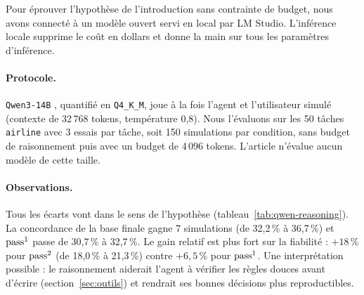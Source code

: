 Pour éprouver l'hypothèse de l'introduction sans contrainte de budget, nous avons connecté \taub{} à un modèle ouvert servi en local par LM Studio. L'inférence locale supprime le coût en dollars et donne la main sur tous les paramètres d'inférence.

\paragraph{Protocole.} \texttt{Qwen3-14B} \cite{qwen3}, quantifié en \texttt{Q4\_K\_M}, joue à la fois l'agent et l'utilisateur simulé (contexte de 32\,768 tokens, température 0,8). Nous l'évaluons sur les 50 tâches \texttt{airline} avec 3 essais par tâche, soit 150 simulations par condition, sans budget de raisonnement puis avec un budget de 4\,096 tokens. L'article n'évalue aucun modèle de cette taille.

\begin{table}[H]
  \centering\small
  \resizebox{\linewidth}{!}{}
  \caption{\texttt{Qwen3-14B} sur \texttt{airline} (50 tâches, 3 essais, $N=150$ par condition), sans et avec budget de raisonnement. Les lignes \texttt{READ} et \texttt{WRITE} comptent les actions de référence effectivement réalisées par l'agent.}
  \label{tab:qwen-reasoning}
\end{table}

\paragraph{Observations.} Tous les écarts vont dans le sens de l'hypothèse (tableau~\ref{tab:qwen-reasoning}). La concordance de la base finale gagne 7 simulations (de 32,2\,\% à 36,7\,\%) et $\text{pass}^{1}$ passe de 30,7\,\% à 32,7\,\%. Le gain relatif est plus fort sur la fiabilité : $+18$\,\% pour $\text{pass}^{2}$ (de 18,0\,\% à 21,3\,\%) contre $+6{,}5$\,\% pour $\text{pass}^{1}$. Une interprétation possible : le raisonnement aiderait l'agent à vérifier les règles douces avant d'écrire (section~\ref{sec:outils}) et rendrait ses bonnes décisions plus reproductibles.

